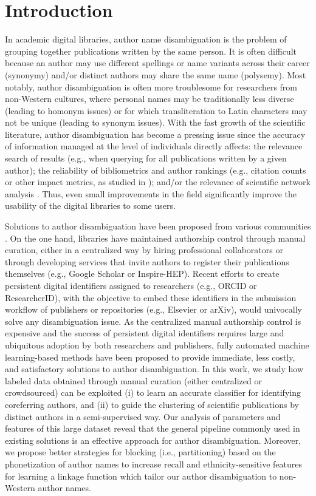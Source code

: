 \documentclass[runningheads,a4paper]{llncs}
\makeatletter
\newcommand*{\eg}{e.g.\@\xspace}
\newcommand*{\ie}{i.e.\@\xspace}
\makeatother
\begin{document}
\section{Introduction}
In academic digital libraries, author name disambiguation is the problem of
grouping together publications written by the same person.
It is often difficult because an author may use different
spellings or name variants across their career (synonymy) and/or distinct authors may
share the same name (polysemy).
Most notably, author disambiguation is often more troublesome for researchers
from non-Western cultures, where personal names may be traditionally less diverse (leading to
homonym issues) or for which transliteration to Latin characters may not be unique (leading to
synonym issues).
With the fast growth of the scientific literature, author disambiguation has become a pressing
issue since the accuracy of information managed at the level of individuals directly affects:
the relevance search of results (\eg, when querying for all publications written by a given author);
the reliability of bibliometrics and author rankings (\eg, citation counts or other impact
metrics, as studied in \cite{strotmann2012author}); and/or the relevance of scientific network analysis
\cite{newman2001structure}. Thus, even small improvements in the field significantly improve the usability of the digital libraries to some users.

Solutions to author disambiguation have been proposed from various
communities \cite{liu2014author}. On the one hand, libraries have maintained
authorship control through manual curation, either in a centralized way by
hiring professional collaborators or through developing services that invite authors to register
their publications themselves (\eg, Google Scholar or Inspire-HEP).
Recent efforts to create persistent digital identifiers assigned to researchers (\eg, ORCID or ResearcherID),
with the objective to embed these identifiers in the submission workflow of publishers
or repositories (\eg, Elsevier or arXiv), would univocally solve any disambiguation issue.
As the centralized manual authorship control is expensive and the success of persistent digital
identifiers requires large and ubiquitous adoption by both researchers and publishers, fully
automated machine learning-based methods have been proposed to
provide immediate, less costly, and satisfactory solutions to author
disambiguation. In this work, we study how labeled data obtained through manual curation (either centralized or
crowdsourced) can be exploited (i) to learn an accurate classifier for
identifying coreferring authors, and (ii) to guide the clustering of scientific
publications by distinct authors in a semi-supervised way.
Our analysis of parameters and features of this large dataset reveal that the general pipeline
commonly used in existing solutions is an effective approach for author disambiguation.
Moreover, we propose better strategies for blocking (\ie, partitioning) based on the
phonetization of author names to increase recall and ethnicity-sensitive features for learning a
linkage function which tailor our author disambiguation to non-Western author names.
\end{document}
